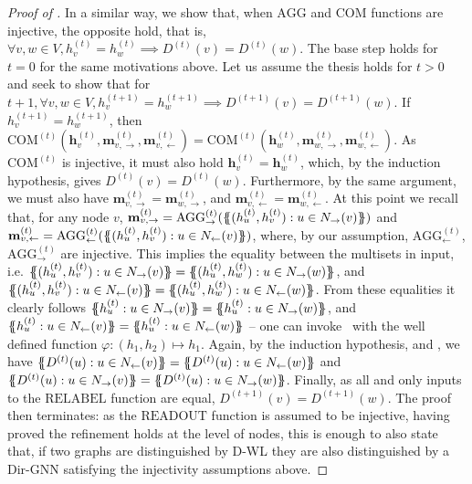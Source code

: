 \documentclass{article}
\newcommand{\inp}{\leftarrow}
\newcommand{\out}{\rightarrow}
\newcommand\oursacro{Dir-GNN}
\newcommand\m{m}
\newcommand*{\ldblbrace}{\{\mskip-6mu\{}
\newcommand*{\rdblbrace}{\}\mskip-6mu\}}
\theoremstyle{plain}
\theoremstyle{definition}
\theoremstyle{remark}
\begin{document}
\begin{proof}[Proof of ]
In a similar way, we show that, when $\textrm{AGG}$ and $\textrm{COM}$ functions are injective, the opposite hold, that is, $\forall v, w \in V, h^{(t)}_v = h^{(t)}_w \implies D^{(t)}(v) = D^{(t)}(w)$. The base step holds for $t=0$ for the same motivations above. Let us assume the thesis holds for $t>0$ and seek to show that for $t+1, \forall v, w \in V, h^{(t+1)}_v = h^{(t+1)}_w \implies D^{(t+1)}(v) = D^{(t+1)}(w)$. If $h^{(t+1)}_v = h^{(t+1)}_w$, then $\mathrm{COM}^{(t)}\left(\mathbf{h}_{v}^{(t)}, \mathbf{\m}^{(t)}_{v,\out}, \mathbf{\m}^{(t)}_{v,\inp}\right) = \mathrm{COM}^{(t)}\left(\mathbf{h}_{w}^{(t)}, \mathbf{\m}^{(t)}_{w,\out}, \mathbf{\m}^{(t)}_{w,\inp}\right)$. As $\mathrm{COM}^{(t)}$ is injective, it must also hold $\mathbf{h}_{v}^{(t)} = \mathbf{h}_{w}^{(t)}$, which, by the induction hypothesis, gives $D^{(t)}(v) = D^{(t)}(w)$. Furthermore, by the same argument, we must also have $\mathbf{\m}^{(t)}_{v,\out} = \mathbf{\m}^{(t)}_{w,\out}$, and $\mathbf{\m}^{(t)}_{v,\inp} = \mathbf{\m}^{(t)}_{w,\inp}$. At this point we recall that, for any node $v$, $\mathbf{\m}^{(t)}_{v,\out} = \textrm{AGG}^{(t)}_\out(\ldblbrace (h^{(t)}_u, h^{(t)}_v) : u \in N_\out(v) \rdblbrace)$ and $\mathbf{\m}^{(t)}_{v,\inp} = \textrm{AGG}^{(t)}_\inp(\ldblbrace (h^{(t)}_u, h^{(t)}_v) : u \in N_\inp(v) \rdblbrace)$, where, by our assumption, $\textrm{AGG}^{(t)}_\inp$, $\textrm{AGG}^{(t)}_\out$ are injective. This implies the equality between the multisets in input, i.e. $\ldblbrace (h^{(t)}_u, h^{(t)}_v) : u \in N_\out(v) \rdblbrace = \ldblbrace (h^{(t)}_u, h^{(t)}_w) : u \in N_\out(w) \rdblbrace$, and $\ldblbrace (h^{(t)}_u, h^{(t)}_v) : u \in N_\inp(v) \rdblbrace = \ldblbrace (h^{(t)}_u, h^{(t)}_w) : u \in N_\inp(w) \rdblbrace$. From these equalities it clearly follows $\ldblbrace h^{(t)}_u : u \in N_\out(v) \rdblbrace = \ldblbrace h^{(t)}_u : u \in N_\out(w) \rdblbrace$, and $\ldblbrace h^{(t)}_u : u \in N_\inp(v) \rdblbrace = \ldblbrace h^{(t)}_u : u \in N_\inp(w) \rdblbrace$ -- one can invoke~\citep[Lemma 3]{bevilacqua2022equivariant} with the well defined function $\varphi: (h_1, h_2) \mapsto h_1$. Again, by the induction hypothesis, and \citep[Lemma 2]{bevilacqua2022equivariant}, we have $\ldblbrace D^{(t)}(u) : u \in N_\inp(v) \rdblbrace = \ldblbrace D^{(t)}(u) : u \in N_\inp(w) \rdblbrace$ and $\ldblbrace D^{(t)}(u) : u \in N_\out(v) \rdblbrace = \ldblbrace D^{(t)}(u) : u \in N_\out(w) \rdblbrace$. Finally, as all and only inputs to the $\textrm{RELABEL}$ function are equal, $D^{(t+1)}(v) = D^{(t+1)}(w)$. The proof then terminates: as the $\textrm{READOUT}$ function is assumed to be injective, having proved the refinement holds at the level of nodes, this is enough to also state that, if two graphs are distinguished by D-WL they are also distinguished by a \oursacro{} satisfying the injectivity assumptions above.
\end{proof}
\end{document}
